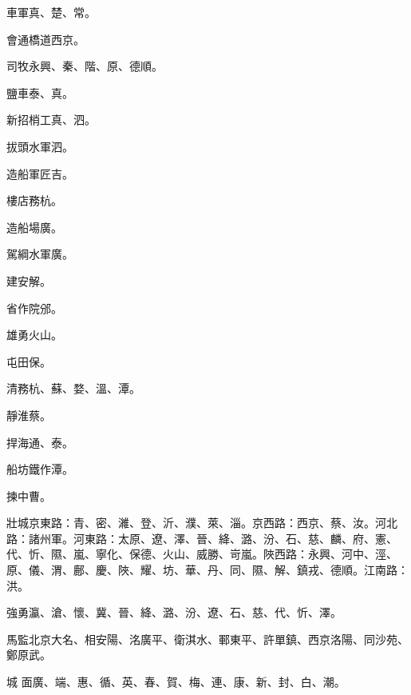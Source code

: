 \begin{pinyinscope}
 車軍真、楚、常。



 會通橋道西京。



 司牧永興、秦、階、原、德順。



 鹽車泰、真。



 新招梢工真、泗。



 拔頭水軍泗。



 造船軍匠吉。



 樓店務杭。



 造船場廣。



 駕綱水軍廣。



 建安解。



 省作院邠。



 雄勇火山。



 屯田保。



 清務杭、蘇、婺、溫、潭。



 靜淮蔡。



 捍海通、泰。



 船坊鐵作潭。



 揀中曹。



 壯城京東路：青、密、濰、登、沂、濮、萊、淄。京西路：西京、蔡、汝。河北路：諸州軍。河東路：太原、遼、澤、晉、絳、潞、汾、石、慈、麟、府、憲、代、忻、隰、嵐、寧化、保德、火山、威勝、岢嵐。陜西路：永興、河中、涇、原、儀、渭、鄜、慶、陜、耀、坊、華、丹、同、隰、解、鎮戎、德順。江南路：洪。



 強勇瀛、滄、懷、冀、晉、絳、潞、汾、遼、石、慈、代、忻、澤。



 馬監北京大名、相安陽、洺廣平、衛淇水、鄆東平、許單鎮、西京洛陽、同沙苑、鄭原武。



 城
 面廣、端、惠、循、英、春、賀、梅、連、康、新、封、白、潮。




\end{pinyinscope}
